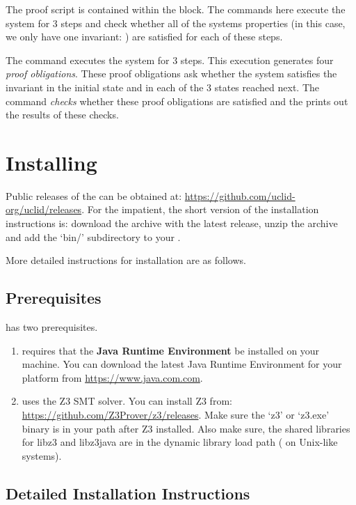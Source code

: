 The proof script is contained within the  block. The commands here execute the system for 3 steps and check whether all of the systems properties (in this case, we only have one invariant: ) are satisfied for each of these steps. 

The command  executes the system for 3 steps. This execution generates four \emph{proof obligations}. These proof obligations ask whether the system satisfies the invariant  in the initial state and in each of the 3 states reached next. The  command \emph{checks} whether these proof obligations are satisfied and the  prints out the results of these checks.

\section{Installing \uclid{}}

Public releases of the \uclid{} can be obtained at: \url{https://github.com/uclid-org/uclid/releases}. For the impatient, the short version of the installation instructions is: download the archive with the latest release, unzip the archive and add the `bin/' subdirectory to your . 

More detailed instructions for installation are as follows.

\subsection{Prerequisites}

\uclid{} has two prerequisites. 
\begin{enumerate}
\item \uclid{} requires that the \textbf{Java Runtime Environment} be installed on your machine. You can download the latest Java Runtime Environment for your platform from \url{https://www.java.com.com}. 
\item \uclid{} uses the Z3 SMT solver. You can install Z3 from: \url{https://github.com/Z3Prover/z3/releases}. Make sure the `z3' or `z3.exe' binary is in your path after Z3 installed. Also make sure, the shared libraries for libz3 and libz3java are in the dynamic library load path ( on Unix-like systems).
\end{enumerate}

\subsection{Detailed Installation Instructions}

